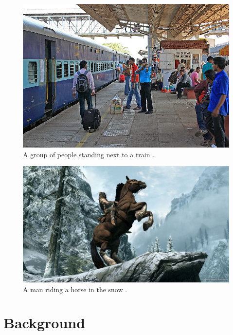 \documentclass[11pt]{article}
\begin{document}
\begin{figure}[ht!]
			    	\centering
					\includegraphics[scale=0.266]{margao_railwaystation_1441973309.jpg}
					\caption{A group of people standing next to a train .\label{fig11}}
\end{figure}
\begin{figure}[ht!]
			    	\centering
					\includegraphics[scale=0.266]{skyrim_Horse01-625x352.jpg}
					\caption{A man riding a horse in the snow .\label{fig12}}
\end{figure}
	\newpage
	\section{Background} 
\end{document}

